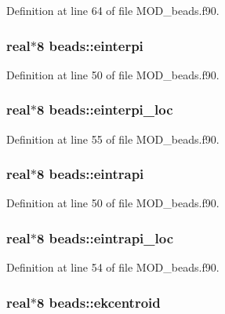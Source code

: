 Definition at line 64 of file M\-O\-D\-\_\-beads.\-f90.

\hypertarget{classbeads_ab3aabcdb848dcaeabe218d7d520ee2b1}{
\subsubsection[{einterpi}]{\setlength{\rightskip}{0pt plus 5cm}real$\ast$8 beads\-::einterpi}}\label{classbeads_ab3aabcdb848dcaeabe218d7d520ee2b1}


Definition at line 50 of file M\-O\-D\-\_\-beads.\-f90.

\hypertarget{classbeads_a8c633b8679d1f8d066adcd2261e62e4a}{
\subsubsection[{einterpi\-\_\-loc}]{\setlength{\rightskip}{0pt plus 5cm}real$\ast$8 beads\-::einterpi\-\_\-loc}}\label{classbeads_a8c633b8679d1f8d066adcd2261e62e4a}


Definition at line 55 of file M\-O\-D\-\_\-beads.\-f90.

\hypertarget{classbeads_a034d51d3942be932ca93b029134bddbe}{
\subsubsection[{eintrapi}]{\setlength{\rightskip}{0pt plus 5cm}real$\ast$8 beads\-::eintrapi}}\label{classbeads_a034d51d3942be932ca93b029134bddbe}


Definition at line 50 of file M\-O\-D\-\_\-beads.\-f90.

\hypertarget{classbeads_a26edcda9f89396d8942be0ffed0a15ab}{
\subsubsection[{eintrapi\-\_\-loc}]{\setlength{\rightskip}{0pt plus 5cm}real$\ast$8 beads\-::eintrapi\-\_\-loc}}\label{classbeads_a26edcda9f89396d8942be0ffed0a15ab}


Definition at line 54 of file M\-O\-D\-\_\-beads.\-f90.

\hypertarget{classbeads_a4d358a2a18572045af499cebdfc02f1d}{
\subsubsection[{ekcentroid}]{\setlength{\rightskip}{0pt plus 5cm}real$\ast$8 beads\-::ekcentroid}}\label{classbeads_a4d358a2a18572045af499cebdfc02f1d}


